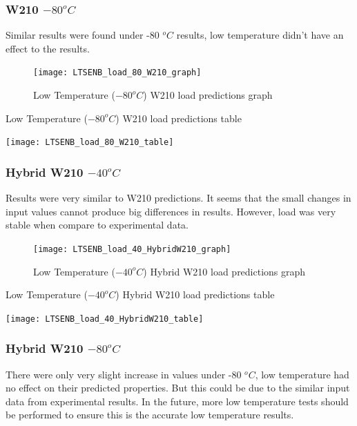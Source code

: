 \documentclass[numbers=noendperiod,chapterprefix=on]{icldt} %
\begin{document}
\subsubsection{W210 $ -80 ^{o}C$}
Similar results were found under -80 $^oC$ results, low temperature didn't have an effect to the results.

\begin{figure}[!hp]
  \centering
  \texttt{[image: LTSENB\_load\_80\_W210\_graph]}\label{LTSENB_load_80_W210_graph}
  \caption{Low Temperature ($ -80 ^{o}C$) W210 load predictions graph}
  \end{figure}
 \FloatBarrier
 
 \begin{table}
    \centering
    \caption{Low Temperature ($ -80 ^{o}C$) W210 load predictions table}\label{LTSENB_load_80_W210_table}
    \texttt{[image: LTSENB\_load\_80\_W210\_table]}
    \end{table}
    \FloatBarrier
     
\subsubsection{Hybrid W210 $ -40 ^{o}C$}
Results were very similar to W210 predictions. It seems that the small changes in input values cannot produce big differences in results. However, load was very stable when compare to experimental data.

\begin{figure}[!hp]
  \centering
  \texttt{[image: LTSENB\_load\_40\_HybridW210\_graph]}\label{LTSENB_load_40_HybridW210_graph}
  \caption{Low Temperature ($ -40 ^{o}C$) Hybrid W210 load predictions graph}
  \end{figure}
 \FloatBarrier
 
 \begin{table}
    \centering
    \caption{Low Temperature ($ -40 ^{o}C$) Hybrid W210 load predictions table}\label{LTSENB_load_40_HybridW210_table}
    \texttt{[image: LTSENB\_load\_40\_HybridW210\_table]}
    \end{table}
    \FloatBarrier
     
\subsubsection{Hybrid W210 $ -80 ^{o}C$}
There were only very slight increase in values under -80 $^oC$, low temperature had no effect on their predicted properties. But this could be due to the similar input data from experimental results. In the future, more low temperature tests should be performed to ensure this is the accurate low temperature results.
\end{document}
